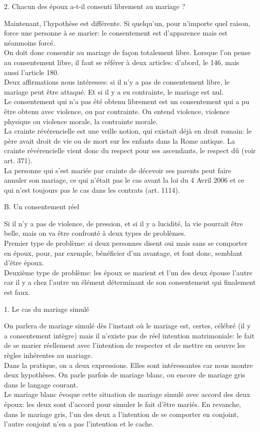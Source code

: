 \documentclass[12pt, a4paper, openany]{book}
\begin{document}
2. Chacun des époux a-t-il consenti librement au mariage ?


Maintenant, l'hypothèse est différente. Si quelqu'un, pour n'importe quel raison, force une personne à se marier: le consentement est d'apparence mais est néanmoins forcé. \\
On doit donc consentir au mariage de façon totalement libre. Lorsque l'on pense au consentement libre, il faut se référer à deux articles: d'abord, le 146, mais aussi l'article 180. \\
Deux affirmations nous intéresses: si il n'y a pas de consentement libre, le mariage peut être attaqué. Et si il y a eu contrainte, le mariage est nul. \\
Le consentement qui n'a pas été obtenu librement est un consentement qui a pu être obtenu avec violence, ou par contrainte. On entend violence, violence physique ou violence morale, la contrainte morale. \\
La crainte révérencielle est une veille notion, qui existait déjà en droit romain: le père avait droit de vie ou de mort sur les enfants dans la Rome antique. La crainte révérencielle vient donc du respect pour ses ascendants, le respect dû (voir art. 371). \\
La personne qui s'est mariée par crainte de décevoir ses parents peut faire annuler son mariage, ce qui n'était pas le cas avant la loi du 4 Avril 2006 et ce qui n'est toujours pas le cas dans les contrats (art. 1114). 


B. Un consentement réel 


Si il n'y a pas de violence, de pression, et si il y a lucidité, la vie pourrait être belle, mais on va être confronté à deux types de problèmes. \\
Premier type de problème: si deux personnes disent oui mais sans se comporter en époux, pour, par exemple, bénéficier d'un avantage, et font donc, semblant d'être époux. \\
Deuxième type de problème: les époux se marient et l'un des deux épouse l'autre car il y a chez l'autre un élément déterminant de son consentement qui finalement est faux. 


1. Le cas du mariage simulé


On parlera de mariage simulé dès l'instant où le mariage est, certes, célébré (il y a consentement intègre) mais il n'existe pas de réel intention matrimoniale: le fait de se marier réellement avec l'intention de respecter et de mettre en oeuvre les règles inhérentes au mariage. \\
Dans la pratique, on a deux expressions. Elles sont intéressantes car nous montre deux hypothèses. On parle parfois de mariage blanc, ou encore de mariage gris dans le langage courant. \\
Le mariage blanc évoque cette situation de mariage simulé avec accord des deux époux: les deux sont d'accord pour simuler le fait d'être mariés. En revanche, dans le mariage gris, l'un des deux a l'intention de se comporter en conjoint, l'autre conjoint n'en a pas l'intention et le cache.
\end{document}
